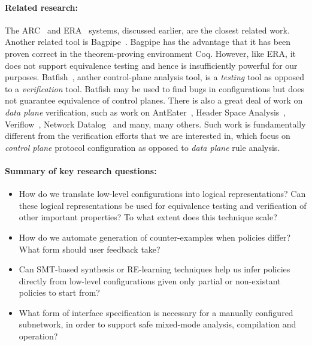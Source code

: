 \paragraph*{Related research:}  The ARC~\cite{arc} and ERA~\cite{era} systems, discussed earlier, are the closest related work.  
Another related tool is Bagpipe~\cite{bagpipe}.  Bagpipe has the advantage that it has been proven correct in the theorem-proving
environment Coq.  However, like ERA, it does not support equivalence testing and hence is insufficiently powerful for our purposes.
Batfish~\cite{batfish}, anther control-plane analysis tool, is a \emph{testing} tool as opposed to a \emph{verification} tool. 
Batfish may be used to find bugs in configurations but does not guarantee equivalence of control planes.  There is also a great deal of work on \emph{data plane} verification, such as work on AntEater~\cite{mai+:anteater}, Header Space Analysis~\cite{hsa},
Veriflow~\cite{khurshid13veriflow}, Network Datalog~\cite{nod} and many, many others.  Such work is fundamentally different from the
verification efforts that we are interested in, which focus on \emph{control plane} protocol configuration as opposed to \emph{data plane} rule analysis.



\paragraph*{Summary of key research questions:}

\begin{itemize}
\item How do we translate low-level configurations into logical representations?  Can these logical representations be used
for equivalence testing and verification of other important properties?  To what extent does this technique scale?

\item How do we automate generation of counter-examples when policies differ? What form should user feedback take?

\item Can SMT-based synthesis or RE-learning techniques help us infer \Name policies directly from low-level configurations given only partial or non-existant \Name policies to start from?

\item What form of interface specification is necessary for a manually configured subnetwork, in order to support safe mixed-mode \Name analysis, compilation and operation?

\end{itemize}





